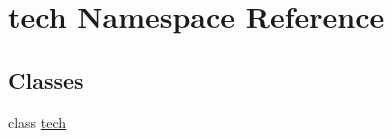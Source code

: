 \hypertarget{namespacetech}{\section{tech Namespace Reference}
\label{namespacetech}
}
\subsection*{Classes}
\begin{DoxyCompactItemize}
\item 
class \hyperlink{classtech_1_1tech}{tech}
\end{DoxyCompactItemize}
